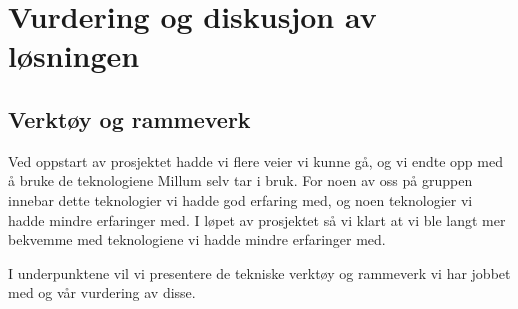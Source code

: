 \section{\textbf{Vurdering og diskusjon av løsningen}}

\subsection{\textbf{Verktøy og rammeverk}}

Ved oppstart av prosjektet hadde vi flere veier vi kunne gå, og vi endte opp med å bruke de teknologiene Millum selv tar i bruk. For noen av oss på gruppen innebar dette teknologier vi hadde god erfaring med, og noen teknologier vi hadde mindre erfaringer med. I løpet av prosjektet så vi klart at vi ble langt mer bekvemme med teknologiene vi hadde mindre erfaringer med.

I underpunktene vil vi presentere de tekniske verktøy og rammeverk vi har jobbet med og vår vurdering av disse.


